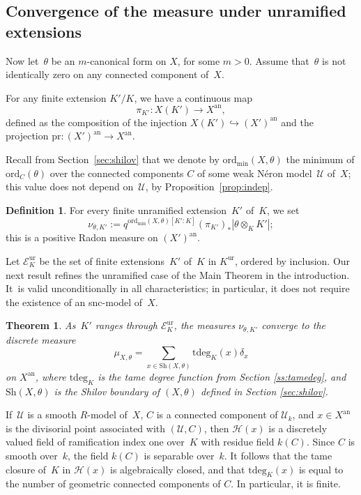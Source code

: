 \documentclass[JEP,XML,SOM,Unicode,NoFloatCountersInSection]{cedram}
\let\mathcal\mathscr
\newtheorem{theorem}[equation]{Theorem}
\theoremstyle{definition}
\newtheorem{definition}[equation]{Definition}
\numberwithin{equation}{subsection}
\newcommand{\cU}{\ensuremath{\mathscr{U}}}
\newcommand{\an}{\mathrm{an}}
\newcommand{\ord}{\mathrm{ord}}
\newcommand{\ordmin}{\ord_{\min}}
\newcommand{\pr}{\mathrm{pr}}
\newcommand{\Sh}{\mathrm{Sh}}
\newcommand{\tdeg}{\mathrm{tdeg}}
\newcommand{\ur}{\mathrm{ur}}
\let\form\theta
\begin{document}
\subsection{Convergence of the measure under unramified extensions}
Now let~$\form$ be an $m$-canonical form on $X$, for some $m>0$.
Assume that~$\form$ is not identically zero on any connected component of~$X$.

For any finite extension $K'/K$, we have a continuous map
\begin{equation*}
\pi_{K'}\colon X(K')\to X^{\an},
\end{equation*}
defined as the composition of the injection $X(K')\hookrightarrow(X')^{\an}$ and the projection $\pr\colon (X')^{\an}\to X^{\an}$.

Recall from Section~\ref{sec:shilov} that we denote by $\ordmin(X,\form)$ the minimum of
$\ord_C(\form)$ over the connected components $C$ of some weak Néron model~$\cU$ of~$X$; this value does not depend on~$\cU$, by Proposition~\ref{prop:indep}.

\begin{definition}\label{def:unram-measure}
For every finite unramified extension~$K'$ of~$K$, we set
\begin{equation*}
\nu_{\form,K'}:=q^{\ordmin(X,\form)[K'\colon K]}(\pi_{K'})_*|\form\otimes_K K'|;
\end{equation*}
this is a positive Radon measure on $(X')^{\an}$.
\end{definition}

Let $\mathcal{E}^{\ur}_K$ be the set of finite extensions~$K'$ of~$K$ in $K^{\ur}$, ordered by inclusion.
Our next result refines the unramified case of the Main Theorem in the introduction. It~is valid unconditionally in all characteristics; in particular, it does not require the existence of an snc-model of~$X$.

\begin{theorem}\label{thm:shi}
As~$K'$ ranges through $\mathcal{E}^{\ur}_K$, the measures $\nu_{\form,K'}$ converge to the discrete measure
\[
\mu_{X,\form}=\sum_{x\in \Sh(X,\form)}\tdeg_{K}(x)\delta_x
\]
on $X^{\an}$, where $\tdeg_K$ is the tame degree function from Section \ref{ss:tamedeg}, and $\Sh(X,\form)$ is the Shilov boundary of $(X,\form)$ defined in Section \ref{sec:shilov}.
\end{theorem}
If~$\cU$ is a smooth $R$\nobreakdash-model of~$X$, $C$ is a connected component of $\cU_k$, and $x\in X^{\an}$ is the divisorial point associated with $(\cU,C)$, then
$\mathscr{H}(x)$ is a discretely valued field of ramification index one over~$K$ with residue field $k(C)$. Since $C$ is smooth over~$k$, the field $k(C)$ is separable over~$k$.
It follows that the tame closure of~$K$ in $\mathscr{H}(x)$ is algebraically closed, and that
$\tdeg_K(x)$ is equal to the number of geometric connected components of $C$. In particular, it is finite.
\end{document}

